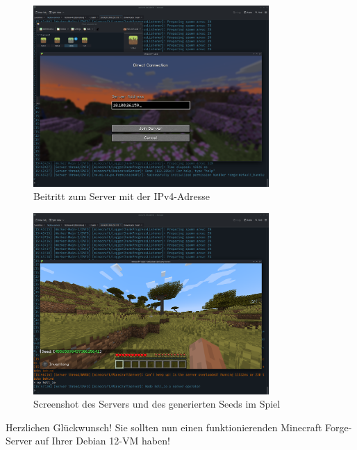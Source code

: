 \documentclass[]{article}
\begin{document}
\begin{figure}[h!]
	\caption{Beitritt zum Server mit der IPv4-Adresse}
	\centering
	\includegraphics[width=0.8\textwidth]{mc-connect}
\end{figure}
\FloatBarrier

\begin{figure}[h!]
	\caption{Screenshot des Servers und des generierten Seeds im Spiel}
	\centering
	\includegraphics[width=0.8\textwidth]{mc-server}
\end{figure}
\FloatBarrier

Herzlichen Glückwunsch! Sie sollten nun einen funktionierenden Minecraft Forge-Server auf Ihrer Debian 12-VM haben!
\end{document}
